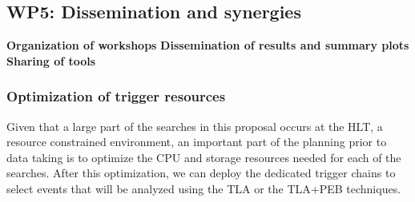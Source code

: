 \subsection{WP5: Dissemination and synergies}
\textbf{Organization of workshops} 
\textbf{Dissemination of results and summary plots} 
\textbf{Sharing of tools} 


\clearpage
\begingroup

    \linespread{0.9}\selectfont

\endgroup
  








\subsubsection{Optimization of trigger resources}

Given that a large part of the searches in this proposal occurs at the HLT, a resource constrained environment, an important part of the planning prior to data taking is to optimize the CPU and storage resources needed for each of the searches. After this optimization, we can deploy the dedicated trigger chains to select events that will be analyzed using the TLA or the TLA+PEB techniques. 

